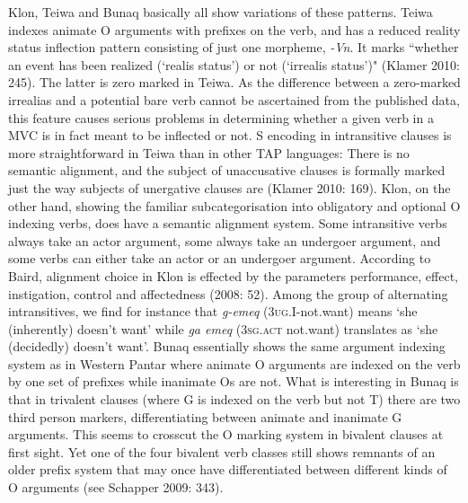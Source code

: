 Klon, Teiwa and Bunaq basically all show variations of these patterns. Teiwa indexes animate O arguments with prefixes on the verb, and has a reduced reality status inflection pattern consisting of just one morpheme, \textit{-Vn}. It marks ``whether an event has been realized (`realis status') or not (`irrealis status')" (Klamer 2010: 245). The latter is zero marked in Teiwa. As the difference between a zero-marked irrealias and a potential bare verb cannot be ascertained from the published data, this feature causes serious problems in determining whether a given verb in a MVC is in fact meant to be inflected or not. S encoding in intransitive clauses is more straightforward in Teiwa than in other TAP languages: There is no semantic alignment, and the subject of unaccusative clauses is formally marked just the way subjects of unergative clauses are (Klamer 2010: 169). Klon, on the other hand, showing the familiar subcategorisation into obligatory and optional O indexing verbs, does have a semantic alignment system. Some intransitive verbs always take an actor argument, some always take an undergoer argument, and some verbs can either take an actor or an undergoer argument. According to Baird, alignment choice in Klon is effected by the parameters performance, effect, instigation, control and affectedness (2008: 52). Among the group of alternating intransitives, we find for instance that \textit{g-emeq} (\textsc{3ug.I}-not.want) means `she (inherently) doesn't want' while \textit{ga emeq} (\textsc{3sg.act} not.want) translates as `she (decidedly) doesn't want'. Bunaq essentially shows the same argument indexing system as in Western Pantar where animate O arguments are indexed on the verb by one set of prefixes while inanimate Os are not. What is interesting in Bunaq is that in trivalent clauses (where G is indexed on the verb but not T) there are two third person markers, differentiating between animate and inanimate G arguments. This seems to crosscut the O marking system in bivalent clauses at first sight. Yet one of the four bivalent verb classes still shows remnants of an older prefix system that may once have differentiated between different kinds of O arguments (see Schapper 2009: 343). 

